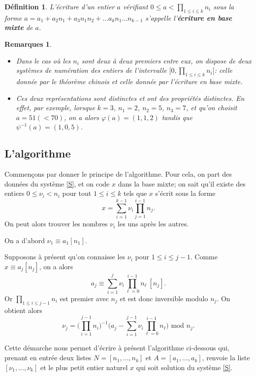 \documentclass[10pt,a4paper]{report}
\newtheorem*{rems}{Remarques}
\newtheorem{Def}[thm]{Définition}
\begin{document}
\begin{Def}
L'écriture d'un entier $a$ vérifiant $0 \leqslant a < \prod_{1 \leqslant i \leqslant k}n_i$ sous la forme $a= a_1+ a_2 n_1+ a_3 n_1 n_2+ \ldots  a_k n_1 \ldots n_{k-1}  $ s'appelle l'\textbf{écriture en base mixte} de $a$. 
\end{Def}

\begin{rems}\
\begin{itemize}
\item[•]
Dans le cas où les $n_i$ sont deux à deux premiers entre eux, on dispose de deux systèmes de numération des entiers de l'intervalle $[0, \prod_{1 \leqslant  i \leqslant k}n_i [ $: celle donnée par le théorème chinois et celle donnée par l'écriture en base mixte.
\item[•] Ces deux représentations sont distinctes et ont des propriétés distinctes. En effet, par exemple, lorsque $k=3$, $n_1=2$, $n_2=5$, $n_3=7$, et qu'on choisit $a=51 (< 70)$, on a alors $\varphi(a)=(1,1,2)$  tandis que $\psi^{-1}(a)=(1,0,5)$.
\end{itemize}
\end{rems}


\subsection{L'algorithme}

Commençons par donner le principe de l'algorithme. Pour cela, on part des données du système \eqref{S}, et on code $x$ dans la base mixte; on sait qu'il existe des entiers $0 \leqslant \nu_i < n_i $ pour tout $1 \leqslant i \leqslant k$ tels que $x$ s'écrit sous la forme
$$   x= \sum_{ i=1}^{k-1} \nu_i \prod_{ j=1}^{ i-1}n_j . $$
On peut alors trouver les nombres $\nu_i$ les uns après les autres.\par 
On a d'abord $\nu_1 \equiv a_1 [n_1]$.\par 
Supposons à présent qu'on connaisse les $\nu_i$ pour $1 \leqslant i \leqslant j-1$. Comme $x \equiv a_j [n_j]$, on a alors
$$   a_j \equiv   \sum_{i=1}^{j} \nu_i \prod_{ \ell=0}^{i-1}n_{\ell}\   [n_j]  .   $$
Or $\prod_{1 \leqslant i \leqslant  j-1 } n_i $ est premier avec $n_j$ et est donc inversible modulo $n_j$. On obtient alors
$$     \nu_j=\Big( \prod_{i=1}^{j-1}n_i \Big)^{-1}  \Big( a_j-    \sum_{i=1}^{ j-1} \nu_i \prod_{\ell=0}^{i-1}n_{\ell} \Big)  \text{ mod } n_j.   $$

Cette démarche nous permet d'écrire à présent l'algorithme ci-dessous qui, prenant en entrée deux listes $N=[n_1, \ldots , n_k]$ et $A=[a_1,\ldots, a_k]$, renvoie la liste  $[\nu_1, \ldots, \nu_k ]$ et le plus petit entier naturel $x$ qui soit solution du système \eqref{S}.\\
\end{document}
